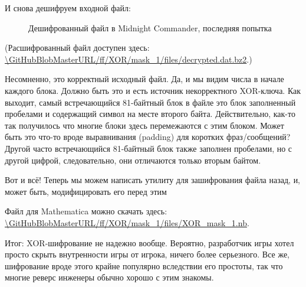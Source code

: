 И снова дешифруем входной файл:

\begin{figure}[H]
\centering
{}
\caption{Дешифрованный файл в Midnight Commander, последняя попытка}
\end{figure}

(Расшифрованный файл доступен здесь:
\url{\GitHubBlobMasterURL/ff/XOR/mask_1/files/decrypted.dat.bz2}.)

Несомненно, это корректный исходный файл.
Да, и мы видим числа в начале каждого блока. Должно быть это и есть источник некорректного XOR-ключа.
Как выходит, самый встречающийся 81-байтный блок в файле это блок заполненный пробелами и содержащий символ  на месте
второго байта.
Действительно, как-то так получилось что многие блоки здесь перемежаются с этим блоком.
Может быть это что-то вроде выравнивания (padding) для коротких фраз/сообщений?
Другой часто встречающийся 81-байтный блок также заполнен пробелами, но с другой цифрой, следовательно,
они отличаются только вторым байтом.

Вот и всё! Теперь мы можем написать утилиту для зашифрования файла назад, и, может быть, модифицировать его перед этим

Файл для Mathematica можно скачать здесь:\\
\url{\GitHubBlobMasterURL/ff/XOR/mask_1/files/XOR_mask_1.nb}.

Итог: XOR-шифрование не надежно вообще. Вероятно, разработчик игры хотел просто скрыть внутренности игры от игрока,
ничего более серьезного.
Все же, шифрование вроде этого крайне популярно вследствии его простоты, так что многие реверс инженеры обычно хорошо
с этим знакомы.

